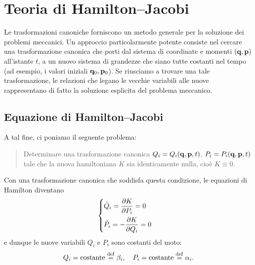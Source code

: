 \chapter{Teoria di Hamilton--Jacobi}

Le trasformazioni canoniche forniscono un metodo generale per la soluzione dei problemi meccanici. Un approccio particolarmente potente consiste nel cercare una trasformazione canonica che porti dal sistema di coordinate e momenti $(\vb{q},\vb{p})$ all'istante $t$, a un nuovo sistema di grandezze che siano tutte costanti nel tempo (ad esempio, i valori iniziali $\vb{q}_0, \vb{p}_0$). Se riusciamo a trovare una tale trasformazione, le relazioni che legano le vecchie variabili alle nuove rappresentano di fatto la soluzione esplicita del problema meccanico.

\section{Equazione di Hamilton--Jacobi}
A tal fine, ci poniamo il seguente problema:
\begin{quote}
    Determinare una trasformazione canonica $Q_i=Q_i(\vb{q},\vb{p},t)$, $P_i=P_i(\vb{q},\vb{p},t)$ tale che la nuova hamiltoniana $K$ sia identicamente nulla, cioè $K \equiv 0$.
\end{quote}
Con una trasformazione canonica che soddisfa questa condizione, le equazioni di Hamilton diventano 
\begin{equation*}
    \begin{cases}
        \displaystyle \dot{Q}_i = \pdv{K}{P_i} = 0 \\[0.3cm]
        \displaystyle \dot{P}_i = -\pdv{K}{Q_i} = 0
    \end{cases}
\end{equation*}
e dunque le nuove variabili $Q_i$ e $P_i$ sono costanti del moto:
\begin{equation*}
    Q_i = \text{costante} \overset{\mathrm{def}}{=} \beta_i, \quad P_i = \text{costante} \overset{\mathrm{def}}{=} \alpha_i.
\end{equation*}

